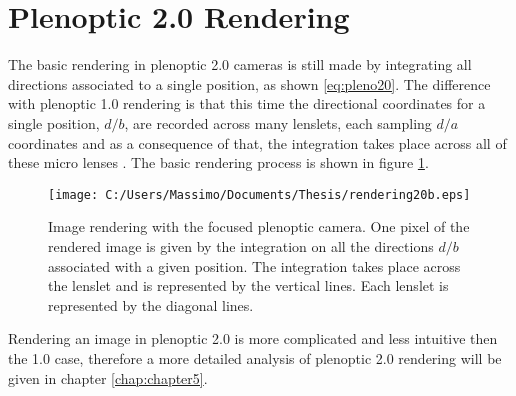    \section{Plenoptic 2.0 Rendering}
   \label{sec:rendering201}
   The basic rendering in plenoptic 2.0 cameras is still made by integrating all directions associated to a single position, as shown \ref{eq:pleno20}. The difference with plenoptic 1.0 rendering is that this time the directional coordinates for a single position, $d/b$, are recorded across many lenslets, each sampling $d/a$ coordinates and as a consequence of that, the integration takes place across all of these micro lenses \cite{georgiev2006light}. The basic rendering process is shown in figure \ref{fig:render20}.
   \begin{figure}[H]
   	\centering
   	\texttt{[image: C:/Users/Massimo/Documents/Thesis/rendering20b.eps]}
   	\caption{\label{fig:render20} Image rendering with the focused plenoptic camera. One pixel of the rendered image is given by the integration on all the directions $d/b$ associated with a given position. The integration takes place across the lenslet and is represented by the vertical lines. Each lenslet is represented by the diagonal lines. }
   \end{figure}
   Rendering an image in plenoptic 2.0 is more complicated and less intuitive then the 1.0 case, therefore a more detailed analysis of plenoptic 2.0 rendering will be given in chapter \ref{chap:chapter5}.
